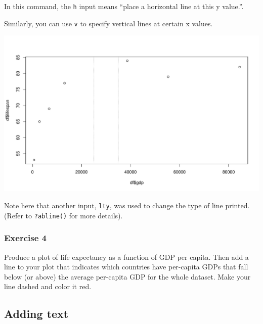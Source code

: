 \documentclass[
]{book}
\newenvironment{Shaded}{\begin{snugshade}}{\end{snugshade}}
\newcommand{\DataTypeTok}[1]{\textcolor[rgb]{0.13,0.29,0.53}{#1}}
\newcommand{\DecValTok}[1]{\textcolor[rgb]{0.00,0.00,0.81}{#1}}
\newcommand{\KeywordTok}[1]{\textcolor[rgb]{0.13,0.29,0.53}{\textbf{#1}}}
\newcommand{\NormalTok}[1]{#1}
\newcommand{\OperatorTok}[1]{\textcolor[rgb]{0.81,0.36,0.00}{\textbf{#1}}}
\newcommand{\StringTok}[1]{\textcolor[rgb]{0.31,0.60,0.02}{#1}}
\begin{document}
In this command, the \texttt{h} input means ``place a horizontal line at this y value.''.

Similarly, you can use \texttt{v} to specify vertical lines at certain x values.

\begin{Shaded}
\end{Shaded}

\includegraphics{figures/unnamed-chunk-104-1.pdf}

Note here that another input, \texttt{lty}, was used to change the type of line printed. (Refer to \texttt{?abline()} for more details).

\hypertarget{exercise-4-1}{%
\subsubsection*{Exercise 4}\label{exercise-4-1}}

Produce a plot of life expectancy as a function of GDP per capita. Then add a line to your plot that indicates which countries have per-capita GDPs that fall below (or above) the average per-capita GDP for the whole dataset. Make your line dashed and color it red.

\hypertarget{adding-text}{%
\subsection*{Adding text}\label{adding-text}}
\end{document}
